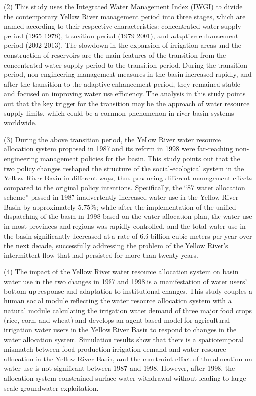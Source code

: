 \begin{eabstract}
  (2) This study uses the Integrated Water Management Index (IWGI) to divide the contemporary Yellow River management period into three stages, which are named according to their respective characteristics: concentrated water supply period (1965 \textendash{} 1978), transition period (1979 \textendash{} 2001), and adaptive enhancement period (2002 \textendash{} 2013). The slowdown in the expansion of irrigation areas and the construction of reservoirs are the main features of the transition from the concentrated water supply period to the transition period. During the transition period, non-engineering management measures in the basin increased rapidly, and after the transition to the adaptive enhancement period, they remained stable and focused on improving water use efficiency. The analysis in this study points out that the key trigger for the transition may be the approach of water resource supply limits, which could be a common phenomenon in river basin systems worldwide.

  (3) During the above transition period, the Yellow River water resource allocation system proposed in 1987 and its reform in 1998 were far-reaching non-engineering management policies for the basin. This study points out that the two policy changes reshaped the structure of the social-ecological system in the Yellow River Basin in different ways, thus producing different management effects compared to the original policy intentions. Specifically, the ``87 water allocation scheme'' passed in 1987 inadvertently increased water use in the Yellow River Basin by approximately $5.75\%$; while after the implementation of the unified dispatching of the basin in 1998 based on the water allocation plan, the water use in most provinces and regions was rapidly controlled, and the total water use in the basin significantly decreased at a rate of 6.6 billion cubic meters per year over the next decade, successfully addressing the problem of the Yellow River's intermittent flow that had persisted for more than twenty years.

  (4) The impact of the Yellow River water resource allocation system on basin water use in the two changes in 1987 and 1998 is a manifestation of water users' bottom-up response and adaptation to institutional changes. This study couples a human social module reflecting the water resource allocation system with a natural module calculating the irrigation water demand of three major food crops (rice, corn, and wheat) and develops an agent-based model for agricultural irrigation water users in the Yellow River Basin to respond to changes in the water allocation system. Simulation results show that there is a spatiotemporal mismatch between food production irrigation demand and water resource allocation in the Yellow River Basin, and the constraint effect of the allocation on water use is not significant between 1987 and 1998. However, after 1998, the allocation system constrained surface water withdrawal without leading to large-scale groundwater exploitation.


\end{eabstract}
